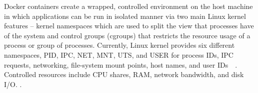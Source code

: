 





Docker containers create a wrapped, controlled environment on the host machine in
which applications can be run in isolated manner via two main Linux kernel
features -- kernel namespaces which are used to split the view that processes have
of the system and control groups (cgroups) that restricts the resource usage of a
process or group of processes.
%
Currently, Linux kernel provides six different namespaces, PID, IPC, NET, MNT,
UTS, and USER for process IDs, IPC requests, networking, file-system mount points,
host names, and user IDs~\cite{xxx}~\cite{xxx}.
%
Controlled resources include CPU shares, RAM, network bandwidth, and disk I/O.
%
.


